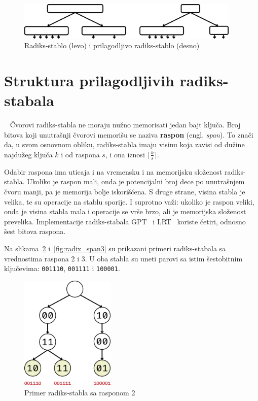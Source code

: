 \documentclass[12pt,oneside]{memoir}
\begin{document}
\hspace{10pt}
\begin{figure}[!h]
  \centering
  \includegraphics[width=0.95\textwidth]{radix_v_art.eps}
  \caption{
    Radiks-stablo (levo) i prilagodljivo radiks-stablo (desno)
  }
  \label{fig:radix_v_art}
\end{figure}

\section{Struktura prilagodljivih radiks-stabala}~\label{sec:struktura_art}
Čvorovi radiks-stabla ne moraju nužno memorisati jedan bajt ključa.
Broj bitova koji unutrašnji čvorovi memorišu se naziva \textbf{raspon} (engl. \emph{span}).
To znači da, u svom osnovnom obliku, radiks-stabla imaju visinu koja zavisi od
dužine najdužeg ključa $k$ i od raspona $s$, i ona iznosi $ \lceil \frac{k}{s} \rceil $.

Odabir raspona ima uticaja i na vremensku i na memorijsku složenost
radiks-stabla. Ukoliko je raspon mali, onda je potencijalni broj dece po
unutrašnjem čvoru manji, pa je memorija bolje iskorišćena. S druge strane,
visina stabla je velika, te su operacije na stablu sporije.
I suprotno važi: ukoliko je raspon veliki,
onda je visina stabla mala i operacije se vrše brzo, ali je memorijska složenost
prevelika. Implementacije radiks-stabala GPT~\cite{gpt} i LRT~\cite{lrt}
koriste četiri, odnosno šest bitova raspona.

Na slikama~\ref{fig:radix_span2}
i~\ref{fig:radix_span3} su prikazani primeri radiks-stabala sa vrednostima
raspona 2 i 3. U oba stabla su uneti parovi sa istim šestobitnim ključevima:
\texttt{001110}, \texttt{001111} i \texttt{100001}.


\begin{figure}[!h]
  \centering
  \includegraphics[width=0.40\textwidth]{radix_span2.eps}
  \caption{Primer radiks-stabla sa rasponom 2}
  \label{fig:radix_span2}
\end{figure}
\end{document}

